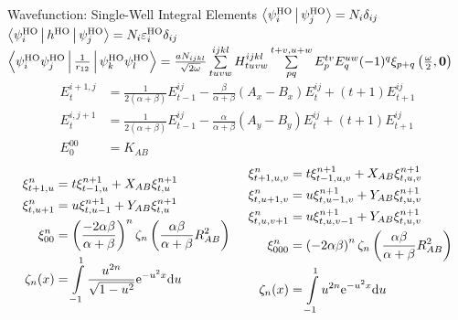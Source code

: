 \documentclass[10pt, t]{beamer}
\begin{document}
\begin{frame}[fragile]{Wavefunction: Single-Well Integral Elements}
    \centering\footnotesize
    $\Braket{\psiHO_i|\psiHO_j} = N_i \delta_{ij}$ \\
    $\Braket{\psiHO_i|h^{\text{HO}}|\psiHO_j} =
    N_i\varepsilon^{\text{HO}}_i\delta_{ij}$ \\
    $\Braket{\psiHO_i\psiHO_j|\frac{1}{r_{12}}|\psiHO_k\psiHO_l} =
    \frac{aN_{ijkl}}{\sqrt{2\omega}}  \sum\limits^{ijkl}_{tuvw} H^{ijkl}_{tuvw}
    \suml{pq}{t+v,u+w} E^{tv}_pE^{uw}_q (-1)^q\xi_{p+q}\left(\frac{\omega}{2},
    \blds{0}\right)$
        \begin{equation*}
            \begin{aligned}
                E^{i+1,j}_t &= \frac{1}{2(\alpha + \beta)}E^{ij}_{t-1} -
                \frac{\beta}{\alpha+\beta}(A_x - B_x)E^{ij}_t +
                (t+1)E^{ij}_{t+1} \\
                E^{i,j+1}_t &= \frac{1}{2(\alpha + \beta)}E^{ij}_{t-1} -
                \frac{\alpha}{\alpha+\beta}(A_y - B_y)E^{ij}_t +
                (t+1)E^{ij}_{t+1} \\
                E^{00}_0 &= K_{AB}
            \end{aligned}
        \end{equation*}
        \begin{equation*}
            \begin{aligned}
                \xi^n_{t+1,u} &= t\xi^{n+1}_{t-1,u} + X_{AB}\xi^{n+1}_{t,u} \\
                \xi^n_{t,u+1} &= u\xi^{n+1}_{t,u-1} + Y_{AB}\xi^{n+1}_{t,u} \\
                \xi^n_{00} &= \left(\frac{-2\alpha\beta}{\alpha+\beta}\right)^n
                \zeta_n\left(\frac{\alpha\beta}{\alpha+\beta} R^2_{AB}\right) \\
                \zeta_n(x) &= \int\limits^1_{-1} \frac{u^{2n}}{\sqrt{1 -
                u^2}} \me^{-u^2x} \md u
            \end{aligned} \hspace{0.5cm}
            \begin{aligned}
                \xi^n_{t+1,u,v} &= t\xi^{n+1}_{t-1,u,v} + X_{AB}\xi^{n+1}_{t,u,v} \\
                \xi^n_{t,u+1,v} &= u\xi^{n+1}_{t,u-1,v} + Y_{AB}\xi^{n+1}_{t,u,v} \\
                \xi^n_{t,u,v+1} &= u\xi^{n+1}_{t,u,v-1} + Y_{AB}\xi^{n+1}_{t,u,v} \\
                \xi^n_{000} &= \left(-2\alpha\beta\right)^n
                \zeta_n\left(\frac{\alpha\beta}{\alpha+\beta} R^2_{AB}\right)
                \\
                \zeta_n(x) &= \int\limits^1_{-1} u^{2n} \me^{-u^2x} \md u
            \end{aligned}
        \end{equation*}
\end{frame}
\end{document}
